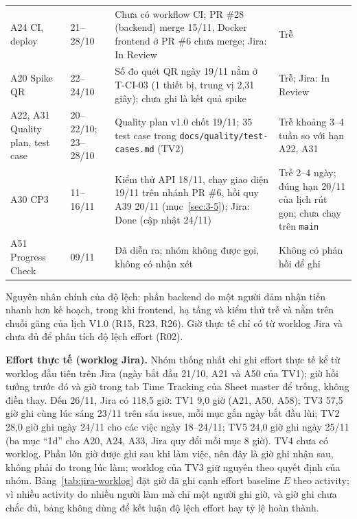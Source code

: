 \begin{longtable}{L{2.2cm}L{2.6cm}L{4.4cm}L{4.0cm}}
A24 CI, deploy & 21--28/10 & Chưa có workflow CI; PR \#28 (backend) merge 15/11, Docker frontend ở PR \#6 chưa merge; Jira: In Review & Trễ \\
A20 Spike QR & 22--24/10 & Số đo quét QR ngày 19/11 nằm ở T-CI-03 (1 thiết bị, trung vị 2,31 giây); chưa ghi là kết quả spike & Trễ; Jira: In Review \\
A22, A31 Quality plan, test case & 20--22/10; 23--28/10 & Quality plan v1.0 chốt 19/11; 35 test case trong \texttt{docs/\allowbreak quality/\allowbreak test-cases.md} (TV2) & Trễ khoảng 3--4 tuần so với hạn A22, A31 \\
A30 CP3 & 11--16/11 & Kiểm thử API 18/11, chạy giao diện 19/11 trên nhánh PR \#6, hồi quy A39 20/11 (mục~\ref{sec:3-5}); Jira: Done (cập nhật 24/11) & Trễ 2--4 ngày; đúng hạn 20/11 của lịch rút gọn; chưa chạy trên \texttt{main} \\
A51 Progress Check & 09/11 & Đã diễn ra; nhóm không được gọi, không có nhận xét & Không có phản hồi để ghi \\
\end{longtable}
\endgroup

Nguyên nhân chính của độ lệch: phần backend do một người đảm nhận tiến nhanh hơn kế hoạch, trong khi frontend, hạ tầng và kiểm thử trễ và nằm trên chuỗi găng của lịch V1.0 (R15, R23, R26). Giờ thực tế chỉ có từ worklog Jira và chưa đủ để phân tích độ lệch effort (R02).

\textbf{Effort thực tế (worklog Jira).} Nhóm thống nhất chỉ ghi effort thực tế kể từ worklog đầu tiên trên Jira (ngày bắt đầu 21/10, A21 và A50 của TV1); giờ hồi tưởng trước đó và giờ trong tab Time Tracking của Sheet master để trống, không điền thay. Đến 26/11, Jira có 118,5 giờ: TV1 9,0 giờ (A21, A50, A58); TV3 57,5 giờ ghi cùng lúc sáng 23/11 trên sáu issue, mỗi mục gắn ngày bắt đầu lùi; TV2 28,0 giờ ghi ngày 24/11 cho các việc ngày 18--24/11; TV5 24,0 giờ ghi ngày 25/11 (ba mục ``1d'' cho A20, A24, A33, Jira quy đổi mỗi mục 8 giờ). TV4 chưa có worklog. Phần lớn giờ được ghi sau khi làm việc, nên đây là giờ ghi nhận sau, không phải đo trong lúc làm; worklog của TV3 giữ nguyên theo quyết định của nhóm. Bảng~\ref{tab:jira-worklog} đặt giờ đã ghi cạnh effort baseline $E$ theo activity; vì nhiều activity do nhiều người làm mà chỉ một người ghi giờ, và giờ ghi chưa chắc đủ, bảng không dùng để kết luận độ lệch effort hay tỷ lệ hoàn thành.

